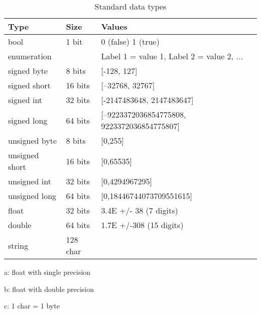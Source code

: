 \documentclass[a4paper, oneside, 11pt, article, english]{memoir}
\begin{document}
\begin{table}[htbp]
  \centering
  \caption{Standard data types}
  \label{tab:datatypes}
  \begin{threeparttable}
    \begin{tabular}{@{}lll@{}}
      \toprule
      Type             & Size               & Values                                          \\
      \midrule
      bool             & 1 bit              & 0 (false) 1 (true)                              \\
      enumeration      &                    & Label 1 = value 1, Label 2 = value 2, ...       \\
      signed byte      & 8 bits             & {[}-128, 127{]}                                 \\
      signed short     & 16 bits            & {[}–32768, 32767{]}                             \\
      signed int       & 32 bits            & {[}-2147483648, 2147483647{]}                   \\
      signed long      & 64 bits            & {[}–9223372036854775808, 9223372036854775807{]} \\
      unsigned byte    & 8 bits             & {[}0,255{]}                                     \\
      unsigned short   & 16 bits            & {[}0,65535{]}                                   \\
      unsigned int     & 32 bits            & {[}0,4294967295{]}                              \\
      unsigned long    & 64 bits            & {[}0,18446744073709551615{]}                    \\
      float\tnote{a}   & 32 bits            & 3.4E +/- 38 (7 digits)                          \\
      double\tnote{b}  & 64 bits            & 1.7E +/-308 (15 digits)                         \\
      string           & 128 char\tnote{c}  &                                                 \\
      \bottomrule
    \end{tabular}
    \begin{tablenotes}
    \item[a:] float with single precision
    \item[b:] float with double precision
    \item[c:] 1 char = 1 byte
    \end{tablenotes}
  \end{threeparttable}
\end{table}
\end{document}
